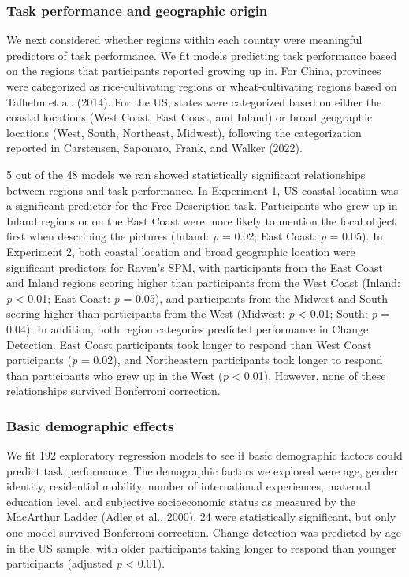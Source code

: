 \documentclass[
  man,floatsintext]{apa6}
\begin{document}
\hypertarget{task-performance-and-geographic-origin}{%
\subsubsection{Task performance and geographic origin}\label{task-performance-and-geographic-origin}}

We next considered whether regions within each country were meaningful predictors of task performance. We fit models predicting task performance based on the regions that participants reported growing up in. For China, provinces were categorized as rice-cultivating regions or wheat-cultivating regions based on Talhelm et al. (2014). For the US, states were categorized based on either the coastal locations (West Coast, East Coast, and Inland) or broad geographic locations (West, South, Northeast, Midwest), following the categorization reported in Carstensen, Saponaro, Frank, and Walker (2022).

5 out of the 48 models we ran showed statistically significant relationships between regions and task performance. In Experiment 1, US coastal location was a significant predictor for the Free Description task. Participants who grew up in Inland regions or on the East Coast were more likely to mention the focal object first when describing the pictures (Inland: \emph{p} = 0.02; East Coast: \emph{p} = 0.05). In Experiment 2, both coastal location and broad geographic location were significant predictors for Raven's SPM, with participants from the East Coast and Inland regions scoring higher than participants from the West Coast (Inland: \emph{p} \textless{} 0.01; East Coast: \emph{p} = 0.05), and participants from the Midwest and South scoring higher than participants from the West (Midwest: \emph{p} \textless{} 0.01; South: \emph{p} = 0.04). In addition, both region categories predicted performance in Change Detection. East Coast participants took longer to respond than West Coast participants (\emph{p} = 0.02), and Northeastern participants took longer to respond than participants who grew up in the West (\emph{p} \textless{} 0.01). However, none of these relationships survived Bonferroni correction.

\hypertarget{basic-demographic-effects}{%
\subsubsection{Basic demographic effects}\label{basic-demographic-effects}}

We fit 192 exploratory regression models to see if basic demographic factors could predict task performance. The demographic factors we explored were age, gender identity, residential mobility, number of international experiences, maternal education level, and subjective socioeconomic status as measured by the MacArthur Ladder (Adler et al., 2000). 24 were statistically significant, but only one model survived Bonferroni correction. Change detection was predicted by age in the US sample, with older participants taking longer to respond than younger participants (adjusted \emph{p} \textless{} 0.01).
\end{document}
